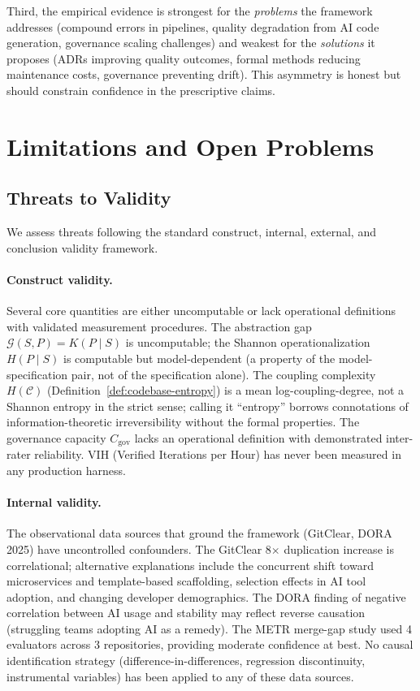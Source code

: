 \documentclass[11pt, a4paper]{googledeepmind}
\begin{document}
Third, the empirical evidence is strongest for the \emph{problems} the framework
addresses (compound errors in pipelines, quality degradation from AI code
generation, governance scaling challenges) and weakest for the \emph{solutions}
it proposes (ADRs improving quality outcomes, formal methods reducing
maintenance costs, governance preventing drift).  This asymmetry is honest but
should constrain confidence in the prescriptive claims.


\section{Limitations and Open Problems}
\label{sec:limitations}

\subsection{Threats to Validity}
\label{sec:threats}

We assess threats following the standard construct, internal, external, and conclusion validity framework.

\paragraph{Construct validity.} Several core quantities are either uncomputable or lack operational definitions with validated measurement procedures. The abstraction gap $\mathcal{G}(S,P) = K(P \mid S)$ is uncomputable; the Shannon operationalization $H(P \mid S)$ is computable but model-dependent (a property of the model-specification pair, not of the specification alone). The coupling complexity $H(\mathcal{C})$ (Definition~\ref{def:codebase-entropy}) is a mean log-coupling-degree, not a Shannon entropy in the strict sense; calling it ``entropy'' borrows connotations of information-theoretic irreversibility without the formal properties. The governance capacity $C_{\text{gov}}$ lacks an operational definition with demonstrated inter-rater reliability. VIH (Verified Iterations per Hour) has never been measured in any production harness.

\paragraph{Internal validity.} The observational data sources that ground the framework (GitClear, DORA 2025) have uncontrolled confounders. The GitClear 8$\times$ duplication increase is correlational; alternative explanations include the concurrent shift toward microservices and template-based scaffolding, selection effects in AI tool adoption, and changing developer demographics. The DORA finding of negative correlation between AI usage and stability may reflect reverse causation (struggling teams adopting AI as a remedy). The METR merge-gap study used 4 evaluators across 3 repositories, providing moderate confidence at best. No causal identification strategy (difference-in-differences, regression discontinuity, instrumental variables) has been applied to any of these data sources.
\end{document}
